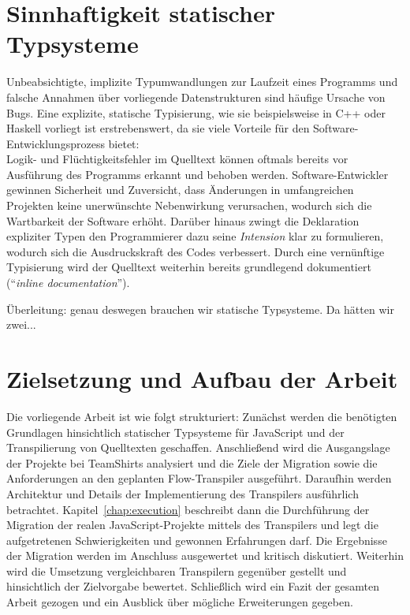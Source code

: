 
\section{Sinnhaftigkeit statischer Typsysteme}

Unbeabsichtigte, implizite Typumwandlungen zur Laufzeit eines Programms und falsche Annahmen über vorliegende Datenstrukturen sind häufige Ursache von Bugs. Eine explizite, statische Typisierung, wie sie beispielsweise in C++ oder Haskell vorliegt ist erstrebenswert, da sie viele Vorteile für den Software-Entwicklungsprozess bietet:\\
Logik- und Flüchtigkeitsfehler im Quelltext können oftmals bereits vor Ausführung des Programms erkannt und behoben werden. Software-Entwickler gewinnen Sicherheit und Zuversicht, dass Änderungen in umfangreichen Projekten keine unerwünschte Nebenwirkung verursachen, wodurch sich die Wartbarkeit der Software erhöht. Darüber hinaus zwingt die Deklaration expliziter Typen den Programmierer dazu seine \emph{Intension} klar zu formulieren, wodurch sich die Ausdruckskraft des Codes verbessert. Durch eine vernünftige Typisierung wird der Quelltext weiterhin bereits grundlegend dokumentiert (\enquote{\textit{inline documentation}}).


Überleitung: genau deswegen brauchen wir statische Typsysteme. Da hätten wir zwei...

\section{Zielsetzung und Aufbau der Arbeit}

Die vorliegende Arbeit ist wie folgt strukturiert: Zunächst werden die benötigten Grundlagen hinsichtlich statischer Typsysteme für JavaScript und der Transpilierung von Quelltexten geschaffen. Anschließend wird die Ausgangslage der Projekte bei TeamShirts analysiert und die Ziele der Migration sowie die Anforderungen an den geplanten Flow-Transpiler ausgeführt. Daraufhin werden Architektur und Details der Implementierung des Transpilers ausführlich betrachtet. Kapitel~\ref{chap:execution} beschreibt dann die Durchführung der Migration der realen JavaScript-Projekte mittels des Transpilers und legt die aufgetretenen Schwierigkeiten und gewonnen Erfahrungen darf. Die Ergebnisse der Migration werden im Anschluss ausgewertet und kritisch diskutiert. Weiterhin wird die Umsetzung vergleichbaren Transpilern gegenüber gestellt und hinsichtlich der Zielvorgabe bewertet. Schließlich wird ein Fazit der gesamten Arbeit gezogen und ein Ausblick über mögliche Erweiterungen gegeben.
